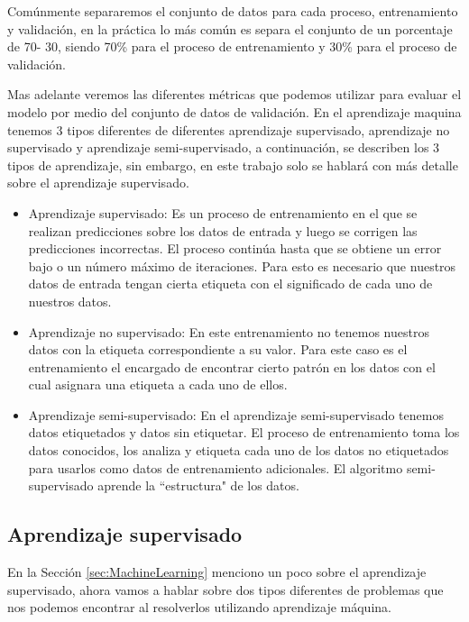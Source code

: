 Comúnmente separaremos el conjunto de datos para cada proceso, entrenamiento y validación, en la práctica lo más común es separa el conjunto de un porcentaje de 70- 30, siendo 70\% para el proceso de entrenamiento y 30\% para el proceso de validación.

Mas adelante veremos las diferentes métricas que podemos utilizar para evaluar el modelo por medio del conjunto de datos de validación. En el aprendizaje maquina tenemos 3 tipos diferentes de diferentes aprendizaje supervisado, aprendizaje no supervisado y aprendizaje semi-supervisado, a continuación, se describen los 3 tipos de aprendizaje, sin embargo, en este trabajo solo se hablará con más detalle sobre el aprendizaje supervisado.

\begin{itemize}

    \item Aprendizaje supervisado: Es un proceso de entrenamiento en el que se realizan predicciones sobre los datos de entrada y luego se corrigen las predicciones incorrectas. El proceso continúa hasta que se obtiene un error bajo o un número máximo de iteraciones. Para esto es necesario que nuestros datos de entrada tengan cierta etiqueta con el significado de cada uno de nuestros datos.

    \item Aprendizaje no supervisado: En este entrenamiento no tenemos nuestros datos con la etiqueta correspondiente a su valor. Para este caso es el entrenamiento el encargado de encontrar cierto patrón en los datos con el cual asignara una etiqueta a cada uno de ellos.

    \item Aprendizaje semi-supervisado: En el aprendizaje semi-supervisado tenemos datos etiquetados y datos sin etiquetar. El proceso de entrenamiento toma los datos conocidos, los analiza y etiqueta cada uno de los datos no etiquetados para usarlos como datos de entrenamiento adicionales. El algoritmo semi-supervisado aprende la “estructura" de los datos.

\end{itemize}


\subsection{Aprendizaje supervisado}

En la Sección \ref{sec:MachineLearning} menciono un poco sobre el aprendizaje supervisado, ahora vamos a hablar sobre dos tipos diferentes de problemas que nos podemos encontrar al resolverlos utilizando aprendizaje máquina.

